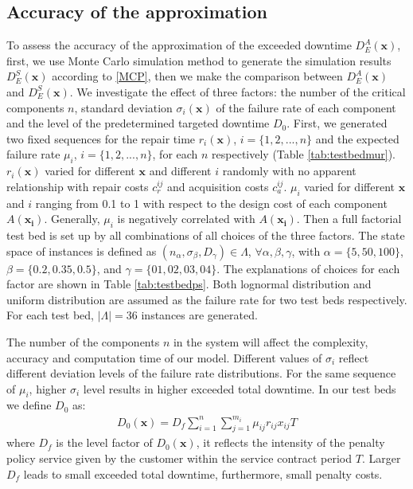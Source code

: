 \documentclass[preprint,12pt]{elsarticle}
\begin{document}
\subsection{Accuracy of the approximation}
To assess the accuracy of the approximation of the exceeded downtime $D_{E}^{A}(\boldsymbol{x})$, first, we use Monte Carlo simulation method to generate the simulation results $D_{E}^{S}(\boldsymbol{x})$ according to \ref{MCP}, then we make the comparison between $D_{E}^{A}(\boldsymbol{x})$ and $D_{E}^{S}(\boldsymbol{x})$. We investigate the effect of three factors: the number of the critical components $n$, standard deviation $\sigma_{i}(\boldsymbol{x})$ of the failure rate of each component and the level of the predetermined targeted downtime $D_{0}$. First, we generated two fixed sequences for the repair time $r_{i}(\boldsymbol{x})$, $i=\{1,2,...,n\}$ and the expected failure rate $\mu_{i}$, $i=\{1,2,...,n\}$, for each $n$ respectively (Table \ref{tab:testbedmur}). $r_{i}(\boldsymbol{x})$ varied for different $\boldsymbol{x}$ and different $i$ randomly with no apparent relationship with repair costs $c_{r}^{ij}$ and acquisition costs $c_{a}^{ij}$. $\mu_{i}$ varied for different $\boldsymbol{x}$ and $i$ ranging from 0.1 to 1 with respect to the design cost of each component $A(\boldsymbol{x_{i}})$. Generally, $\mu_{i}$ is negatively correlated with $A(\boldsymbol{x_{i}})$. Then a full factorial test bed is set up by all combinations of all choices of the three factors. The state space of instances is defined as $(n_{\alpha},\sigma_{\beta},D_{\gamma}) \in \Lambda$, $\forall \alpha, \beta, \gamma$, with $\alpha=\{5,50,100\}$, $\beta=\{0.2,0.35,0.5\}$, and $\gamma =\{01,02,03,04\}$. The explanations of choices for each factor are shown in Table \ref{tab:testbedps}. Both lognormal distribution and uniform distribution are assumed as the failure rate for two test beds respectively. For each test bed, $|\Lambda|=$36 instances are generated.

The number of the components $n$ in the system will affect the complexity, accuracy and computation time of our model. Different values of $\sigma_{i}$ reflect different deviation levels of the failure rate distributions. For the same sequence of $\mu_{i}$, higher $\sigma_{i}$ level results in higher exceeded total downtime. In our test beds we define $D_0$ as:
 \begin{eqnarray}
 D_{0}(\boldsymbol{x}) = D_{f}\sum_{i=1}^{n}{\sum_{j=1}^{m_{i}}{\mu_{ij}r_{ij}x_{ij}T}} \label{D0}
\end{eqnarray}
where $D_{f}$ is the level factor of $D_{0}(\boldsymbol{x})$, it reflects the intensity of the penalty policy service given by the customer within the service contract period $T$. Larger $D_{f}$ leads to small exceeded total downtime, furthermore, small penalty costs.
\end{document}
